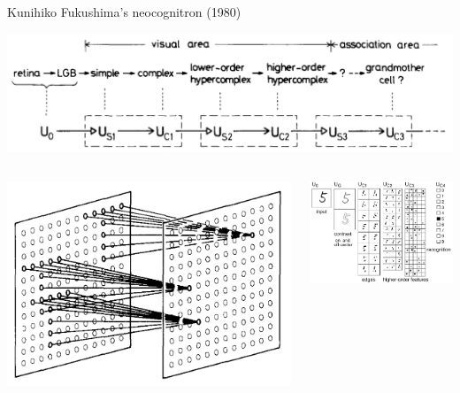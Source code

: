 \documentclass[aspectratio=169]{beamer}
\begin{document}
\begin{frame}{Kunihiko Fukushima's neocognitron (1980)}
\vspace{0.15 cm}
\begin{center}
\includegraphics[width=0.75\linewidth]{higher-order-features.png}
\end{center}

\vspace{0.15 cm}
\begin{columns}
\includegraphics[width=\linewidth]{convolutional-planes.png}

\includegraphics[width=\linewidth]{convolutional-recognition.png}
\end{columns}
\end{frame}
\end{document}
